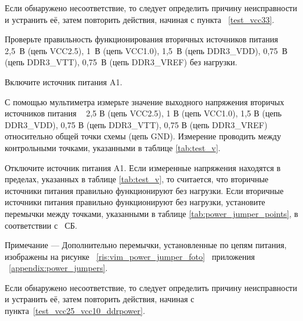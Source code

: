     \subsubpoint Если обнаружено несоответствие, то следует определить причину неисправности и устранить её, затем повторить действия, начиная с пункта~ \ref{test_vcc33}.
  
  \begin{sloppypar}
  \subpoint Проверьте правильность функционирования вторичных источников питания \DocProductShortTitle~ 
	    2,5~В (цепь VCC2.5), 1~В (цепь VCC1.0), 1,5~В (цепь DDR3\_VDD), 0,75~В (цепь DDR3\_VTT), 0,75~В (цепь DDR3\_VREF) без нагрузки.
  \end{sloppypar}  
  \label {test_vcc25_vcc10_ddrpower} %
  
    \subsubpoint Включите источник питания A1.
    \begin{sloppypar}
    \subsubpoint С помощью мультиметра измерьте значение выходного напряжения вторичых источников питания \DocProductShortTitle~ 
		  2,5 В (цепь VCC2.5), 1 В (цепь VCC1.0), 1,5 В (цепь DDR3\_VDD), 0,75 В (цепь DDR3\_VTT), 0,75 В (цепь DDR3\_VREF) относительно общей точки схемы (цепь GND). 
		  Измерение проводить между контрольными точками, указанными в таблице \ref{tab:test_v}.        
    \end{sloppypar}
    \subsubpoint Отключите источник питания A1.
    \subsubpoint Если измеренные напряжения находятся в пределах, указанных в таблице \ref{tab:test_v}, то считается, что вторичные источники питания правильно функционируют без нагрузки.
    \subsubpoint Если вторичные источники питания правильно функционируют без нагрузки, установите перемычки между точками, указанными в таблице \ref{tab:power_jumper_points}, 
    в соответствии с \DocProductSignature~СБ.
    
    \begin{footnotesize}    
      Примечание --- Дополнительно перемычки, установленные по цепям питания, изображены на рисунке ~\ref{ris:vim_power_jumper_foto}~ приложения ~\ref{appendix:power_jumpers}.
    \end{footnotesize}  
		  
    \subsubpoint Если обнаружено несоответствие, то следует определить причину неисправности и устранить её, затем повторить действия, начиная с пункта~\ref{test_vcc25_vcc10_ddrpower}.
  
  
    
        

